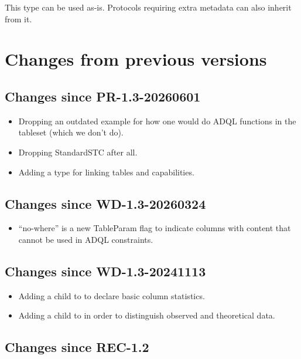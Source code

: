 \documentclass[11pt,a4paper]{ivoa}
\begin{document}

This type can be used as-is.  Protocols requiring extra metadata can
also inherit from it.


\appendix

\section{Changes from previous versions}

\subsection{Changes since PR-1.3-20260601}

\begin{itemize}
\item Dropping an outdated example for how one would do ADQL functions
in the tableset (which we don't do).
\item Dropping StandardSTC after all.
\item Adding a type  for linking tables
and capabilities.
\end{itemize}

\subsection{Changes since WD-1.3-20260324}

\begin{itemize}
\item ``no-where'' is a new TableParam flag to indicate columns with
content that cannot be used in ADQL constraints.
\end{itemize}

\subsection{Changes since WD-1.3-20241113}

\begin{itemize}
\item Adding a  child to  to declare
basic column statistics.
\item Adding a  child to  in order
to distinguish observed and theoretical data.
\end{itemize}

\subsection{Changes since REC-1.2}
\end{document}
